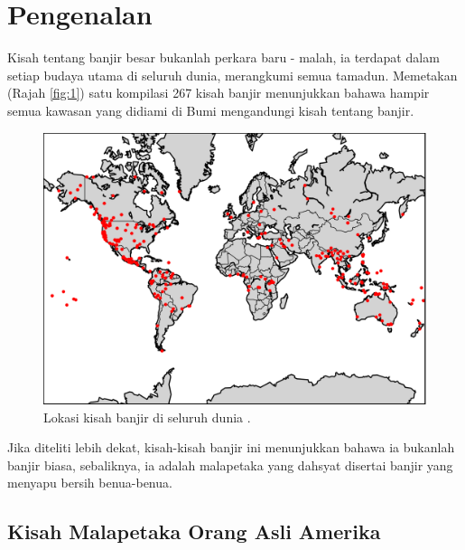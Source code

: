 \documentclass[10pt,twocolumn,letterpaper]{article}
\begin{document}
\section{Pengenalan}

Kisah tentang banjir besar bukanlah perkara baru - malah, ia terdapat dalam setiap budaya utama di seluruh dunia, merangkumi semua tamadun. Memetakan (Rajah \ref{fig:1}) satu kompilasi 267 kisah banjir \cite{3} menunjukkan bahawa hampir semua kawasan yang didiami di Bumi mengandungi kisah tentang banjir.

\begin{figure}[h]
\begin{center}
   \includegraphics[width=1\linewidth]{b.png}
\end{center}
   \caption{Lokasi kisah banjir di seluruh dunia \cite{3}.}
\label{fig:1}
\label{fig:onecol}
\end{figure}

Jika diteliti lebih dekat, kisah-kisah banjir ini menunjukkan bahawa ia bukanlah banjir biasa, sebaliknya, ia adalah malapetaka yang dahsyat disertai banjir yang menyapu bersih benua-benua.

\subsection{Kisah Malapetaka Orang Asli Amerika}
\end{document}
